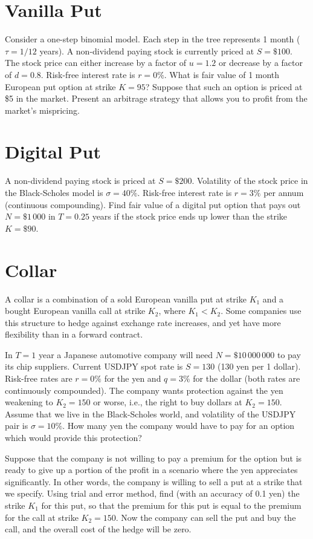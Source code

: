 \documentclass[a4paper,14pt]{extarticle}
\begin{document}
\section{Vanilla Put}

Consider a one-step binomial model. Each step in the tree represents 1 month ($\tau = 1/12$ years). A non-dividend paying stock is currently priced at $S=\$100$. The stock price can either increase by a factor of $u = 1.2$ or decrease by a factor of $d = 0.8$. Risk-free interest rate is $r = 0\%$. What is fair value of 1 month European put option at strike $K = 95$? Suppose that such an option is priced at \$5 in the market. Present an arbitrage strategy that allows you to profit from the market's mispricing.

\section{Digital Put}

A non-dividend paying stock is priced at $S = \$200$. Volatility of the stock price in the Black-Scholes model is $\sigma = 40\%$. Risk-free interest rate is $r = 3\%$ per annum (continuous compounding). Find fair value of a digital put option that pays out $N = \$1\,000$ in $T = 0.25$ years if the stock price ends up lower than the strike $K = \$90$.

\section{Collar}

A collar is a combination of a sold European vanilla put at strike $K_1$ and a bought European vanilla call at strike $K_2$, where $K_1 < K_2$. Some companies use this structure to hedge against exchange rate increases, and yet have more flexibility than in a forward contract.

In $T=1$ year a Japanese automotive company will need $N=\$10\,000\,000$ to pay its chip suppliers. Current USDJPY spot rate is $S=130$ (130 yen per 1 dollar). Risk-free rates are $r=0\%$ for the yen and $q=3\%$ for the dollar (both rates are continuously compounded). The company wants protection against the yen weakening to $K_2 = 150$ or worse, i.e., the right to buy dollars at $K_2=150$. Assume that we live in the Black-Scholes world, and volatility of the USDJPY pair is $\sigma=10\%$. How many yen the company would have to pay for an option which would provide this protection?

Suppose that the company is not willing to pay a premium for the option but is ready to give up a portion of the profit in a scenario where the yen appreciates significantly. In other words, the company is willing to sell a put at a strike that we specify. Using trial and error method, find (with an accuracy of 0.1 yen) the strike $K_1$ for this put, so that the premium for this put is equal to the premium for the call at strike $K_2=150$. Now the company can sell the put and buy the call, and the overall cost of the hedge will be zero.
\end{document}
